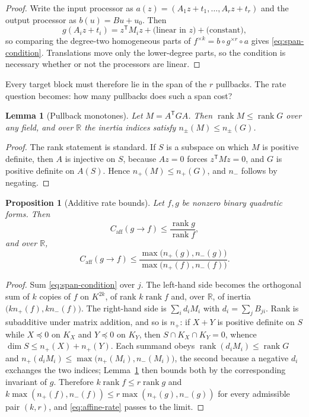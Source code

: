 \documentclass[11pt]{article}
\theoremstyle{definition}
\theoremstyle{plain}
\newtheorem{proposition}[definition]{Proposition}
\newtheorem{lemma}[definition]{Lemma}
\theoremstyle{remark}
\newcommand{\R}{\mathbb R}
\newcommand{\rank}{\operatorname{rank}}
\newcommand{\caff}{C_{\mathrm{aff}}}
\begin{document}
\begin{proof}
Write the input processor as \(a(z)=(A_1z+t_1,\ldots,A_rz+t_r)\) and the
output processor as \(b(u)=Bu+u_0\).  Then
\[
  g(A_iz+t_i)=z^{\mathsf T}M_iz+\text{(linear in \(z\))}+\text{(constant)},
\]
so comparing the degree-two homogeneous parts of
\(f^{\times k}=b\circ g^{\times r}\circ a\) gives
\eqref{eq:span-condition}.  Translations move only the lower-degree parts, so
the condition is necessary whether or not the processors are linear.
\end{proof}

Every target block must therefore lie in the span of the \(r\) pullbacks.  The
rate question becomes: how many pullbacks does such a span cost?

\begin{lemma}[Pullback monotones]
\label{lem:pullback-monotones}
Let \(M=A^{\mathsf T}GA\).  Then \(\rank M\le\rank G\) over any field, and over
\(\R\) the inertia indices satisfy \(n_\pm(M)\le n_\pm(G)\).
\end{lemma}

\begin{proof}
The rank statement is standard.  If \(S\) is a subspace on which \(M\) is
positive definite, then \(A\) is injective on \(S\), because \(Az=0\) forces
\(z^{\mathsf T}Mz=0\), and \(G\) is positive definite on \(A(S)\).  Hence
\(n_+(M)\le n_+(G)\), and \(n_-\) follows by negating.
\end{proof}

\begin{proposition}[Additive rate bounds]
\label{prop:additive-bounds}
Let \(f,g\) be nonzero binary quadratic forms.  Then
\begin{equation}
  \caff(g\to f)\le\frac{\rank g}{\rank f},
  \label{eq:rank-bound}
\end{equation}
and over \(\R\),
\begin{equation}
  \caff(g\to f)
  \le\frac{\max\bigl(n_+(g),n_-(g)\bigr)}{\max\bigl(n_+(f),n_-(f)\bigr)}.
  \label{eq:inertia-bound}
\end{equation}
\end{proposition}

\begin{proof}
Sum \eqref{eq:span-condition} over \(j\).  The left-hand side becomes the
orthogonal sum of \(k\) copies of \(f\) on \(K^{2k}\), of rank
\(k\rank f\) and, over \(\R\), of inertia
\(\bigl(kn_+(f),kn_-(f)\bigr)\).  The right-hand side is
\(\sum_id_iM_i\) with \(d_i=\sum_jB_{ji}\).  Rank is subadditive under matrix
addition, and so is \(n_+\): if \(X+Y\) is positive definite on \(S\) while
\(X\preceq0\) on \(K_X\) and \(Y\preceq0\) on \(K_Y\), then
\(S\cap K_X\cap K_Y=0\), whence
\(\dim S\le n_+(X)+n_+(Y)\).  Each summand obeys
\(\rank(d_iM_i)\le\rank G\) and
\(n_+(d_iM_i)\le\max\bigl(n_+(M_i),n_-(M_i)\bigr)\), the second because a
negative \(d_i\) exchanges the two indices; Lemma~\ref{lem:pullback-monotones}
then bounds both by the corresponding invariant of \(g\).  Therefore
\(k\rank f\le r\rank g\) and \(k\max(n_+(f),n_-(f))\le r\max(n_+(g),n_-(g))\)
for every admissible pair \((k,r)\), and \eqref{eq:affine-rate} passes to the
limit.
\end{proof}
\end{document}

